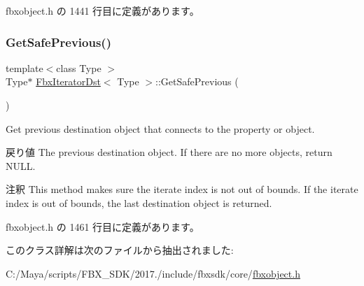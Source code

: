  fbxobject.\+h の 1441 行目に定義があります。

\mbox{\label{class_fbx_iterator_dst_a8ccdc9811e9315aa7d5d30ff595615ef}} 
\subsubsection{\texorpdfstring{Get\+Safe\+Previous()}{GetSafePrevious()}}
{\footnotesize\ttfamily template$<$class Type $>$ \\
Type$\ast$ \hyperlink{class_fbx_iterator_dst}{Fbx\+Iterator\+Dst}$<$ Type $>$\+::Get\+Safe\+Previous (\begin{DoxyParamCaption}{ }\end{DoxyParamCaption})\hspace{0.3cm}{\ttfamily [inline]}}

Get previous destination object that connects to the property or object. \begin{DoxyReturn}{戻り値}
The previous destination object. If there are no more objects, return N\+U\+LL. 
\end{DoxyReturn}
\begin{DoxyRemark}{注釈}
This method makes sure the iterate index is not out of bounds. If the iterate index is out of bounds, the last destination object is returned. 
\end{DoxyRemark}


 fbxobject.\+h の 1461 行目に定義があります。



このクラス詳解は次のファイルから抽出されました\+:\begin{DoxyCompactItemize}
\item 
C\+:/\+Maya/scripts/\+F\+B\+X\+\_\+\+S\+D\+K/2017./include/fbxsdk/core/\hyperlink{fbxobject_8h}{fbxobject.\+h}\end{DoxyCompactItemize}
